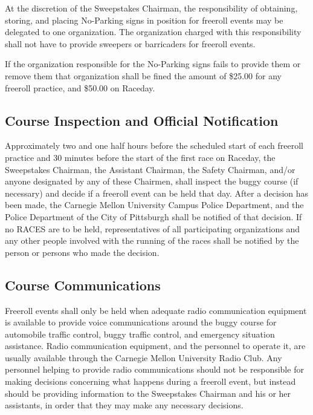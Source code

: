 	At the discretion of the Sweepstakes Chairman, the responsibility of obtaining,
	storing, and placing No-Parking signs in position for freeroll events may be
	delegated to one organization. The organization charged with this
	responsibility shall not have to provide sweepers or barricaders for freeroll
	events.

	If the organization responsible for the No-Parking signs fails to provide them
	or remove them that organization shall be fined the
	amount of \$25.00 for any freeroll practice, and \$50.00 on Raceday.


\subsection{Course Inspection and Official Notification}

	Approximately two and one half hours before the scheduled start of each
	freeroll practice and 30 minutes before the start of the first race on Raceday,
	the Sweepstakes Chairman, the Assistant Chairman, the Safety
	Chairman, and/or anyone designated by any of these Chairmen, shall inspect the
	buggy course (if necessary) and decide if a freeroll event can be held that
	day. After a decision has been made, the Carnegie Mellon University Campus
	Police Department, and the Police Department of the City of Pittsburgh shall be
	notified of that decision. If no RACES are to be held,
	representatives of all participating organizations and any other people
	involved with the running of the races shall be notified by the person or
	persons who made the decision.


\subsection{Course Communications}

	Freeroll events shall only be held when adequate radio communication
	equipment is available to provide voice communications around the buggy course
	for automobile traffic control, buggy traffic control, and emergency situation
	assistance. Radio communication equipment, and the personnel to operate it, are
	usually available through the Carnegie Mellon University Radio Club. Any
	personnel helping to provide radio communications should not be responsible for
	making decisions concerning what happens during a freeroll event, but
	instead should be providing information to the Sweepstakes Chairman and his or
	her assistants, in order that they may make any necessary decisions.


